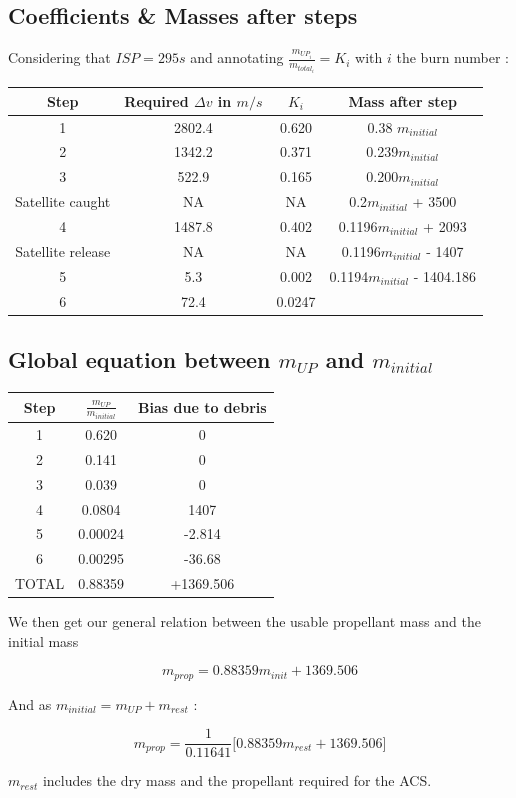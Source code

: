 \hypertarget{header-n3}{%
	\subsection{Coefficients \& Masses after steps}\label{header-n3}}

Considering that \(ISP = 295s\) and annotating
\(\frac{m_{UP_i}}{m_{total_i}} = K_i\) with \(i\) the burn number :

\begin{longtable}[]{@{}cccc@{}}
	\toprule
	Step & Required \(\Delta v\) in \(m/s\) & \(K_i\) & Mass after
	step\tabularnewline
	\midrule
	\endhead
	1 & 2802.4 & 0.620 & 0.38 \(m_{initial}\)\tabularnewline
	2 & 1342.2 & 0.371 & 0.239\(m_{initial}\)\tabularnewline
	3 & 522.9 & 0.165 & 0.200\(m_{initial}\)\tabularnewline
	Satellite caught & NA & NA & 0.2\(m_{initial}\) + 3500\tabularnewline
	4 & 1487.8 & 0.402 & 0.1196\(m_{initial}\) + 2093\tabularnewline
	Satellite release & NA & NA & 0.1196\(m_{initial}\) -
	1407\tabularnewline
	5 & 5.3 & 0.002 & 0.1194\(m_{initial}\) - 1404.186\tabularnewline
	6 & 72.4 & 0.0247 &\tabularnewline
	\bottomrule
\end{longtable}

\hypertarget{header-n51}{%
	\subsection{\texorpdfstring{Global equation between \(m_{UP}\) and
			\(m_{initial}\)}{Global equation between m\_\{UP\} and m\_\{initial\}}}\label{header-n51}}

\begin{longtable}[]{@{}ccc@{}}
	\toprule
	Step & \(\frac{m_{UP}}{m_{initial}}\) & Bias due to
	debris\tabularnewline
	\midrule
	\endhead
	1 & 0.620 & 0\tabularnewline
	2 & 0.141 & 0\tabularnewline
	3 & 0.039 & 0\tabularnewline
	4 & 0.0804 & 1407\tabularnewline
	5 & 0.00024 & -2.814\tabularnewline
	6 & 0.00295 & -36.68\tabularnewline
	TOTAL & 0.88359 & +1369.506\tabularnewline
	\bottomrule
\end{longtable}

We then get our general relation between the usable propellant mass and
the initial mass

\[m_{prop} = 0.88359 m_{init} + 1369.506\]

And as \(m_{initial} = m_{UP} + m_{rest}\) :

\[m_{prop} = \frac 1{0.11641}\bigg[0.88359 m_{rest} + 1369.506\bigg]\]

\(m_{rest}\) includes the dry mass and the propellant required for the
ACS.

